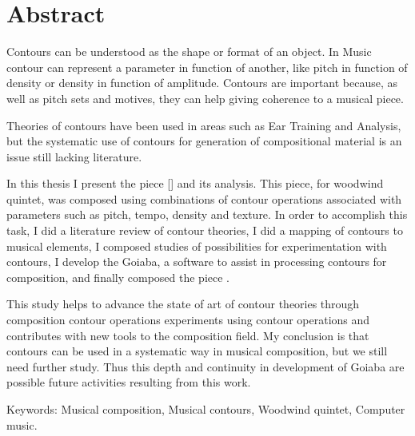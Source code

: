 \chapter*{Abstract}
\label{cha:abstract}

Contours can be understood as the shape or format of an object. In
Music contour can represent a parameter in function of another, like
pitch in function of density or density in function of
amplitude. Contours are important because, as well as pitch sets and
motives, they can help giving coherence to a musical piece.

Theories of contours have been used in areas such as Ear Training and
Analysis, but the systematic use of contours for generation of
compositional material is an issue still lacking literature.

In this thesis I present the piece \obra{} [] and its analysis. This piece, for woodwind quintet,
was composed using combinations of contour operations associated with
parameters such as pitch, tempo, density and texture. In order to
accomplish this task, I did a literature review of contour theories, I
did a mapping of contours to musical elements, I composed studies of
possibilities for experimentation with contours, I develop the Goiaba,
a software to assist in processing contours for composition, and
finally composed the piece \obra{}.

This study helps to advance the state of art of contour theories
through composition contour operations experiments using contour
operations and contributes with new tools to the composition field.
My conclusion is that contours can be used in a systematic way in
musical composition, but we still need further study. Thus this depth
and continuity in development of Goiaba are possible future activities
resulting from this work.

Keywords: Musical composition, Musical contours, Woodwind quintet,
Computer music.
